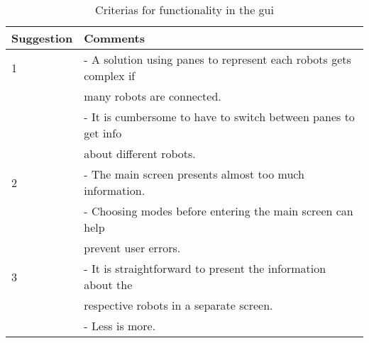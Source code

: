 \begin{table}[ht]
\begin{center}
\begin{tabular}{|l | l|} 
\hline
Suggestion  &   Comments \\
 \hline
1           &   - A solution using panes to represent each robots gets complex if\\
            &   many robots are connected. \\
            &   - It is cumbersome to have to switch between panes to get info\\
            &   about different robots. \\
\hline
2           &   - The main screen presents almost too much information. \\
            &   - Choosing modes before entering the main screen can help\\
            &   prevent user errors. \\
\hline
3           &   - It is straightforward to present the information about the\\
            &   respective robots in a separate screen. \\
            &   - Less is more. \\
\hline
\end{tabular}
\end{center}
\caption{Criterias for functionality in the \acrshort{gui}}
\label{tab:guifeedback}
\end{table}

